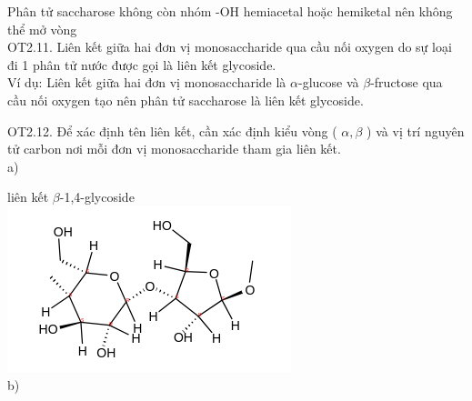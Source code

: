 \documentclass[10pt]{article}
\begin{document}
Phân tử saccharose không còn nhóm -OH hemiacetal hoặc hemiketal nên không thể mở vòng\\
OT2.11. Liên kết giữa hai đơn vị monosaccharide qua cầu nối oxygen do sự loại đi 1 phân tử nước được gọi là liên kết glycoside.\\
Ví dụ: Liên kết giữa hai đơn vị monosaccharide là $\alpha$-glucose và $\beta$-fructose qua cầu nối oxygen tạo nên phân tử saccharose là liên kết glycoside.

OT2.12. Để xác định tên liên kết, cần xác định kiểu vòng ( $\alpha, \beta$ ) và vị trí nguyên tử carbon nơi mỗi đơn vị monosaccharide tham gia liên kết.\\
a)

liên kết $\beta$-1,4-glycoside\\
\includegraphics{smile-8480a29702ca044dd1c6b9824b1a6783d041f69d}\\
b)
\end{document}
